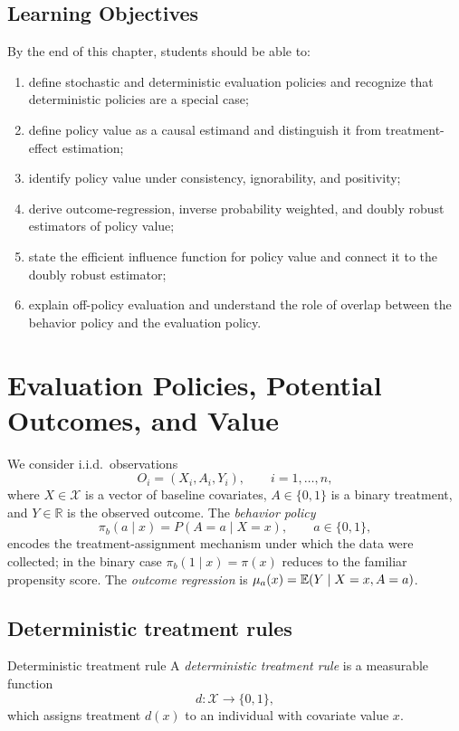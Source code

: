 \documentclass[master.tex]{subfiles}
\begin{document}
\subsection*{Learning Objectives}
By the end of this chapter, students should be able to:
\begin{enumerate}
    \item define stochastic and deterministic evaluation policies and recognize that deterministic policies are a special case;
    \item define policy value as a causal estimand and distinguish it from treatment-effect estimation;
    \item identify policy value under consistency, ignorability, and positivity;
    \item derive outcome-regression, inverse probability weighted, and doubly robust estimators of policy value;
    \item state the efficient influence function for policy value and connect it to the doubly robust estimator;
    \item explain off-policy evaluation and understand the role of overlap between the behavior policy and the evaluation policy.
\end{enumerate}

\section{Evaluation Policies, Potential Outcomes, and Value}
\label{w13:sec:policies}

We consider i.i.d.\ observations
\[
O_i=(X_i,A_i,Y_i), \qquad i=1,\dots,n,
\]
where $X\in\mathcal X$ is a vector of baseline covariates, $A\in\{0,1\}$ is a binary treatment, and $Y\in\mathbb R$ is the observed outcome.  The \emph{behavior policy}
\[
\pi_b(a\mid x)=P(A=a\mid X=x), \qquad a\in\{0,1\},
\]
encodes the treatment-assignment mechanism under which the data were collected; in the binary case $\pi_b(1\mid x)=\pi(x)$ reduces to the familiar propensity score.  The \emph{outcome regression} is $\mu_a(x)=\mathbb{E}(Y\mid X=x,A=a)$.

\subsection{Deterministic treatment rules}
\label{w13:subsec:det-rules}

\begin{defn}{Deterministic treatment rule}
\label{w13:defn:det-rule}
A \emph{deterministic treatment rule} is a measurable function
\[
d:\mathcal X\to\{0,1\},
\]
which assigns treatment $d(x)$ to an individual with covariate value $x$.
\end{defn}
\end{document}
